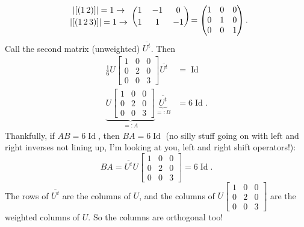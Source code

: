 \documentclass[12pt]{article}
\theoremstyle{definition}
\DeclareMathOperator\Id{Id}
\begin{document}
\begin{enumerate}[start=0]
\begin{equation}
\begin{blockarray}{cccc}
\begin{block}{c(ccc)}
            |[(1\,2)]| = 1 \rightarrow & 1 & -1 & 0 \\[0.2 em]
            |[(1\,2\,3)]| = 1 \rightarrow & 1 & 1 & -1 \\
            \end{block}
        \end{blockarray}
        =
        \begin{pmatrix}
            1 & 0 & 0 \\
            0 & 1 & 0 \\
            0 & 0 & 1
        \end{pmatrix}.
    \end{equation}
    Call the second matrix (unweighted) $\overline{U^t}$. Then 
    \begin{equation}
        \begin{split}
            \frac{1}{6} U 
            \begin{bmatrix}
                1 & 0 & 0 \\
                0 & 2 & 0 \\
                0 & 0 & 3
            \end{bmatrix}
            \overline{U^t} & = \Id \\
            \underbrace{U 
            \begin{bmatrix}
                1 & 0 & 0 \\
                0 & 2 & 0 \\
                0 & 0 & 3
            \end{bmatrix}}_{=:A}
            \underbrace{\overline{U^t}}_{=:B} & = 6 \Id.
        \end{split}
    \end{equation}
    Thankfully, if $AB = 6 \Id$, then $BA = 6 \Id$ (no silly stuff going on with left and right inverses not lining up, I'm looking at you, left and right shift operators!):
    \begin{equation}
        BA = \overline{U^t} U 
        \begin{bmatrix}
            1 & 0 & 0 \\
            0 & 2 & 0 \\
            0 & 0 & 3
        \end{bmatrix}
        = 6 \Id.
    \end{equation}
    The rows of $\overline{U^t}$ are the columns of $U$, and the columns of 
    $U 
    \begin{bmatrix}
        1 & 0 & 0 \\
        0 & 2 & 0 \\
        0 & 0 & 3
    \end{bmatrix}$ are the weighted columns of $U$. So the columns are orthogonal too!
    

\end{enumerate}
\end{document}

